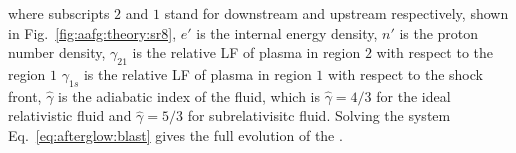 %
where subscripts $2$ and $1$ stand for downstream and upstream respectively, 
shown in Fig.~\ref{fig:aafg:theory:sr8}, 
$e'$ is the internal energy density, $n'$ is the proton number density, 
$\gamma_{21}$ is the relative \ac{LF} of plasma in region 
$2$ with respect to the region $1$
$\gamma_{1s}$ is the relative \ac{LF} of plasma in region $1$ with respect to the shock front,
$\hat{\gamma}$ is the adiabatic index of the fluid, which is $\hat{\gamma}=4/3$ for the ideal relativistic 
fluid and $\hat{\gamma}=5/3$ for subrelativisitc fluid.
%
Solving the system Eq.~\eqref{eq:afterglow:blast} gives the full evolution 
of the \blast{}. 

































